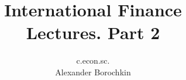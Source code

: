 \documentclass[xcolor=table, color=usenames, dvipsnames]{beamer}
\title[International Economics]{International Finance\\Lectures. Part 2}
\author{c.econ.sc.\\ Alexander Borochkin}
\institute{}
\date{\the\year}
\begin{document}
\begin{frame}
\titlepage
\end{frame}


















\begin{comment}
\end{comment}
\end{document}
